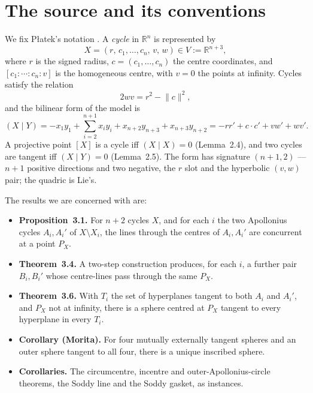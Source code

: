 \documentclass[11pt]{article}
\theoremstyle{definition}
\theoremstyle{remark}
\newcommand{\RR}{\mathbb{R}}
\begin{document}
\section{The source and its conventions}\label{sec:source}

We fix Płatek's notation \cite{platek}. A \emph{cycle} in $\RR^n$ is represented by
\[
X=(r,\,c_1,\dots,c_n,\,v,\,w)\in V:=\RR^{n+3},
\]
where $r$ is the signed radius, $c=(c_1,\dots,c_n)$ the centre coordinates, and $[c_1:\cdots:c_n:v]$
is the homogeneous centre, with $v=0$ the points at infinity. Cycles satisfy the relation
\begin{equation}\label{eq:def21}
2wv=r^2-\lVert c\rVert^2 ,
\end{equation}
and the bilinear form of the model is
\begin{equation}\label{eq:sourceform}
(X\mid Y)=-x_1y_1+\sum_{i=2}^{n+1}x_iy_i+x_{n+2}y_{n+3}+x_{n+3}y_{n+2}
=-rr'+c\cdot c'+vw'+wv' .
\end{equation}
A projective point $[X]$ is a cycle iff $(X\mid X)=0$ (Lemma~2.4), and two cycles are tangent iff
$(X\mid Y)=0$ (Lemma~2.5). The form has signature $(n+1,2)$ --- $n+1$ positive directions and two negative, the $r$ slot and the
hyperbolic $(v,w)$ pair; the quadric is Lie's.

The results we are concerned with are:

\begin{itemize}
\item \textbf{Proposition~3.1.} For $n+2$ cycles $X$, and for each $i$ the two Apollonius cycles
$A_i,A_i'$ of $X\setminus X_i$, the lines through the centres of $A_i,A_i'$ are concurrent at a
point $P_X$.
\item \textbf{Theorem~3.4.} A two-step construction produces, for each $i$, a further pair
$B_i,B_i'$ whose centre-lines pass through the same $P_X$.
\item \textbf{Theorem~3.6.} With $T_i$ the set of hyperplanes tangent to both $A_i$ and $A_i'$, and
$P_X$ not at infinity, there is a sphere centred at $P_X$ tangent to every hyperplane in every $T_i$.
\item \textbf{Corollary (Morita).} For four mutually externally tangent spheres and an outer sphere
tangent to all four, there is a unique inscribed sphere.
\item \textbf{Corollaries.} The circumcentre, incentre and outer-Apollonius-circle theorems, the
Soddy line and the Soddy gasket, as instances.
\end{itemize}
\end{document}
